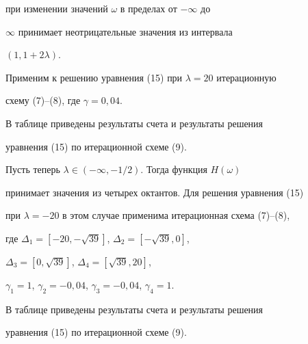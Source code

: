 \begin{exam}
при изменении значений $\omega $ в пределах от $-\infty $ до


$\infty $ принимает неотрицательные значения из интервала


$ (1,1+2\lambda)$.





Применим к решению уравнения (15) при $\lambda=20 $ итерационную


схему (7)--(8), где $\gamma=0,04$.


В таблице приведены результаты счета и результаты решения


уравнения (15) по итерационной схеме (9).





Пусть теперь $\lambda\in(-\infty,-1/2)$. Тогда функция $ H(\omega)$


принимает значения из четырех октантов. Для решения уравнения (15)


при $\lambda=-20 $ в этом случае применима итерационная схема (7)--(8),


где $\Delta_1=[-20,-\sqrt{39}]$, $\Delta_2=[-\sqrt{39},0]$,


$\Delta_3=[0,\sqrt{39}]$, $\Delta_4 =[\sqrt{39}, 20]$,


$\gamma_1=1$, $\gamma_2=-0,04$, $\gamma_3=-0,04$, $\gamma_4 =1$.


В таблице приведены результаты счета и результаты решения


уравнения (15) по итерационной схеме (9).


\end{exam}








